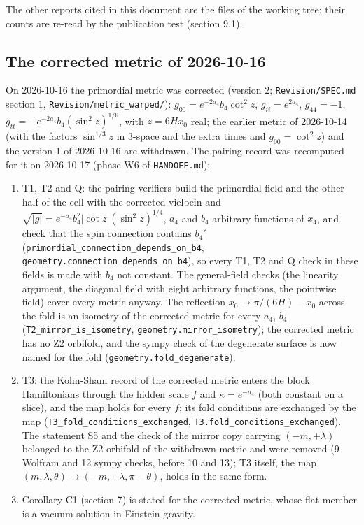 \documentclass[11pt]{article}
\begin{document}
The other reports cited in this document are the files of the working tree; their counts are re-read by the publication test (section 9.1).

\subsection{The corrected metric of 2026-10-16}

On 2026-10-16 the primordial metric was corrected (version 2; \texttt{Revision\allowbreak{}/SPEC.md} section 1, \texttt{Revision\allowbreak{}/metric\_\allowbreak{}warped/}): $g_{00} = e^{-2a_4}b_4\cot^2 z$, $g_{ii} = e^{2a_4}$, $g_{44} = -1$, $g_{tt} = -e^{-2a_4}b_4(\sin^2 z)^{1/6}$, with $z = 6Hx_0$ real; the earlier metric of 2026-10-14 (with the factors $\sin^{1/3}z$ in 3-space and the extra times and $g_{00} = \cot^2 z$) and the version 1 of 2026-10-16 are withdrawn. The pairing record was recomputed for it on 2026-10-17 (phase W6 of \texttt{HANDOFF.\allowbreak{}md}):

\begin{enumerate}
\item T1, T2 and Q: the pairing verifiers build the primordial field and the other half of the cell with the corrected vielbein and $\sqrt{|g|} = e^{-a_4}b_4^2|\cot z|(\sin^2 z)^{1/4}$, $a_4$ and $b_4$ arbitrary functions of $x_4$, and check that the spin connection contains $b_4'$ (\texttt{primordi\allowbreak{}al\_conne\allowbreak{}ction\_de\allowbreak{}pends\_on\allowbreak{}\_b4}, \texttt{geometry\allowbreak{}.connect\allowbreak{}ion\_depe\allowbreak{}nds\_on\_b\allowbreak{}4}), so every T1, T2 and Q check in these fields is made with $b_4$ not constant. The general-field checks (the linearity argument, the diagonal field with eight arbitrary functions, the pointwise field) cover every metric anyway. The reflection $x_0 \to \pi/(6H) - x_0$ across the fold is an isometry of the corrected metric for every $a_4$, $b_4$ (\texttt{T2\_mirro\allowbreak{}r\_is\_iso\allowbreak{}metry}, \texttt{geometry\allowbreak{}.mirror\_\allowbreak{}isometry}); the corrected metric has no Z2 orbifold, and the sympy check of the degenerate surface is now named for the fold (\texttt{geometry\allowbreak{}.fold\_de\allowbreak{}generate}).
\item T3: the Kohn-Sham record of the corrected metric enters the block Hamiltonians through the hidden scale $f$ and $\kappa = e^{-a_4}$ (both constant on a slice), and the map holds for every $f$; its fold conditions are exchanged by the map (\texttt{T3\_fold\_\allowbreak{}conditio\allowbreak{}ns\_excha\allowbreak{}nged}, \texttt{T3.fold\_\allowbreak{}conditio\allowbreak{}ns\_excha\allowbreak{}nged}). The statement S5 and the check of the mirror copy carrying $(-m,+\lambda)$ belonged to the Z2 orbifold of the withdrawn metric and were removed (9 Wolfram and 12 sympy checks, before 10 and 13); T3 itself, the map $(m,\lambda,\theta) \to (-m,+\lambda,\pi - \theta)$, holds in the same form.
\item Corollary C1 (section 7) is stated for the corrected metric, whose flat member is a vacuum solution in Einstein gravity.
\end{enumerate}
\end{document}
